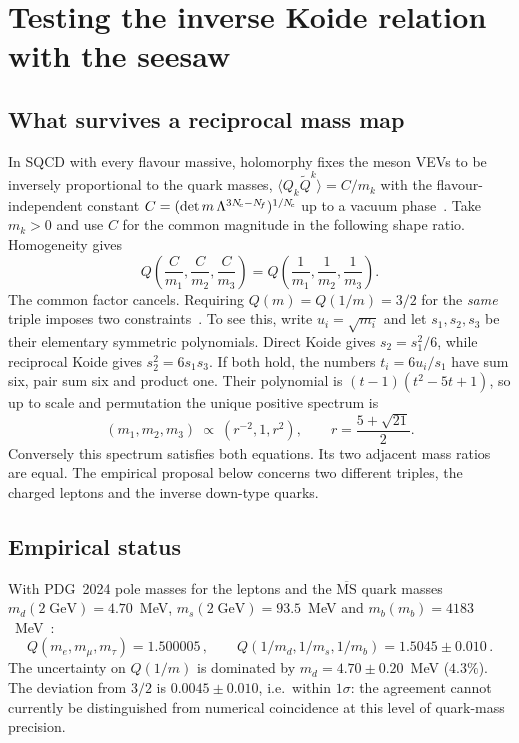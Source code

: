 \documentclass[11pt,a4paper]{article}
\begin{document}
\section{Testing the inverse Koide relation with the seesaw}
\label{sec:inverse}

\subsection{What survives a reciprocal mass map}

In SQCD with every flavour massive, holomorphy fixes the meson VEVs
to be inversely proportional to the quark masses,
$\langle Q_k\widetilde Q^k\rangle = C/m_k$ with the flavour-independent
constant $C = (\det m\,\Lambda^{3N_{\!c}-N_{\!f}})^{1/N_{\!c}}$ up to a vacuum
phase~\cite{IntriligatorSeiberg1995}.  Take $m_k>0$ and use $C$ for
the common magnitude in the following shape ratio.  Homogeneity gives
\begin{equation}
  Q\!\left(\frac{C}{m_1},\frac{C}{m_2},\frac{C}{m_3}\right)
  = Q\!\left(\frac{1}{m_1},\frac{1}{m_2},\frac{1}{m_3}\right).
  \label{eq:Q-inverse}
\end{equation}
The common factor cancels.  Requiring $Q(m)=Q(1/m)=3/2$ for the
\emph{same} triple imposes two constraints~\cite{AlphaShape}.  To see
this, write $u_i=\sqrt{m_i}$ and let $s_1,s_2,s_3$ be their elementary
symmetric polynomials.  Direct Koide gives $s_2=s_1^2/6$, while
reciprocal Koide gives $s_2^2=6s_1s_3$.  If both hold, the numbers
$t_i=6u_i/s_1$ have sum six, pair sum six and product one.  Their
polynomial is $(t-1)(t^2-5t+1)$, so up to scale and permutation the
unique positive spectrum is
\begin{equation}
 (m_1,m_2,m_3)\ \propto\ (r^{-2},1,r^2),\qquad
 r=\frac{5+\sqrt{21}}2 .
 \label{eq:reciprocal-spectrum}
\end{equation}
Conversely this spectrum satisfies both equations.  Its two adjacent
mass ratios are equal.  The empirical proposal below concerns two
different triples, the charged leptons and the inverse down-type quarks.

\subsection{Empirical status}

With PDG~2024 pole masses for the leptons and the
$\overline{\text{MS}}$ quark masses $m_d(2\;\text{GeV}) = 4.70$~MeV,
$m_s(2\;\text{GeV}) = 93.5$~MeV and $m_b(m_b) = 4183$~MeV~\cite{AHS2025}:
\begin{equation}
  Q(m_e,m_\mu,m_\tau) = 1.500005\,,\qquad
  Q(1/m_d,1/m_s,1/m_b) = 1.5045 \pm 0.010\,.
\end{equation}
The uncertainty on $Q(1/m)$ is dominated by $m_d = 4.70 \pm 0.20$~MeV
($4.3\%$).  The deviation from $3/2$ is $0.0045 \pm 0.010$, i.e.\
within $1\sigma$: the agreement cannot currently be distinguished
from numerical coincidence at this level of quark-mass precision.
\end{document}
